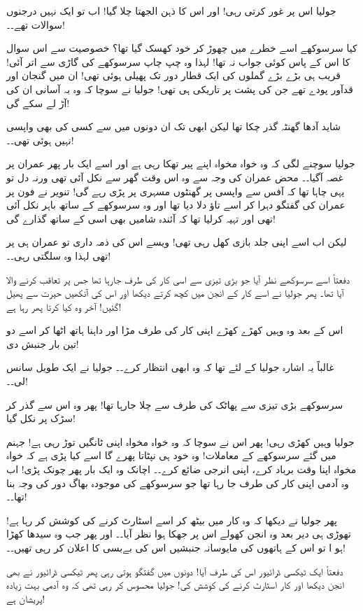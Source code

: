 جولیا اس پر غور کرتی رہی! اور اس کا ذہن الجھتا چلا گیا! اب تو ایک نہیں درجنوں سوالات تھے۔۔!

کیا سرسوکھے اسے خطرے میں چھوڑ کر خود کھسک گیا تھا؟ خصوصیت سے اس سوال کا اس کے پاس کوئی جواب نہ تھا! لہذا وہ چپ چاپ سرسوکھے کی گاڑی سے اتر آئی! قریب ہی بڑے بڑے گملوں کی ایک قطار دور تک پھیلی ہوئی تھی! ان میں گنجان اور قدآور پودے تھے جن کی پشت پر تاریکی ہی تھی! جولیا نے سوچا کہ وہ بہ آسانی ان کی آڑ لے سکے گی!

شاید آدھا گھنٹہ گذر چکا تھا لیکن ابھی تک ان دونوں میں سے کسی کی بھی واپسی نہیں ہوئی تھی۔۔!

جولیا سوچنے لگی کہ وہ خواہ مخواہ اپنے پیر تھکا رہی ہے اور اسے ایک بار پھر عمران پر غصہ آگیا۔۔ محض عمران کی وجہ سے وہ اس وقت گھر سے نکل آئی تھی ورنہ دل تو یہی چاہا تھا کہ آفس سے واپسی پر گھنٹوں مسہری پر پڑی رہے گی! تنویر نے فون پر عمران کی گفتگو دہرا کر اسے تاؤ دلا دیا تھا اور وہ سرسوکھے کے ساتھ باہر نکل آئی تھی اور تہیہ کرلیا تھا کہ آئندہ شامیں بھی اسی کے ساتھ گذارے گی!

لیکن اب اسے اپنی جلد بازی کھل رہی تھی! ویسے اس کی ذمہ داری تو عمران ہی پر تھی لہذا وہ سلگتی رہی۔۔!

دفعتاً اسے سرسوکھے نظر آیا جو بڑی تیزی سے اسی کار کی طرف جارہا تھا جس پر تعاقب کرنے والا آیا تھا۔ پھر جولیا نے اسے کار کے انجن میں کچھ کرتے دیکھا اور اس کی آنکھیں حیرت سے پھیل گئیں! آخر وہ کیا کرتا پھر رہا ہے!

اس کے بعد وہ وہیں کھڑے کھڑے اپنی کار کی طرف مڑا اور داہنا ہاتھ اٹھا کر اسے دو تین بار جنبش دی!

غالباً یہ اشارہ جولیا کے لئے تھا کہ وہ ابھی انتظار کرے۔۔ جولیا نے ایک طویل سانس لی۔۔!

سرسوکھے بڑی تیزی سے پھاٹک کی طرف سے چلا جارہا تھا! پھر وہ اس سے گذر کر سڑک پر نکل گیا!

جولیا وہیں کھڑی رہی! پھر اس نے سوچا کہ وہ خواہ مخواہ اپنی ٹانگیں توڑ رہی ہے! جہنم میں گئے سرسوکھے کے معاملات! وہ خود ہی نپٹاتا پھرے گا اسے کیا پڑی ہے کہ خواہ مخواہ اپنا وقت برباد کرے، اپنی انرجی ضائع کرے۔۔ اچانک وہ ایک بار پھر چونک پڑی!
اب وہ آدمی اپنی کار کی طرف جا رہا تھا جو سرسوکھے کی موجودہ بھاگ دور کی وجہ بنا تھا۔۔!

پھر جولیا نے دیکھا کہ وہ کار میں بیٹھ کر اسے اسٹارٹ کرنے کی کوشش کر رہا ہے! تھوڑی ہی دیر بعد وہ انجن کھولے اس پر جھکا ہوا نظر آیا۔۔ اور پھر جب وہ سیدھا کھڑا ہو ا تو اس کے ہاتھوں کی مایوسانہ جنبشیں اس کی بےبسی کا اعلان کر رہی تھیں۔۔!

دفعتاً ایک ٹیکسی ڈرائیور اس کی طرف آیا! دونوں میں گفتگو ہوتی رہی پھر ٹیکسی ڈرائیور نے بھی انجن دیکھا اور کار اسٹارٹ کرنے کی کوشش کی! جولیا محسوس کر رہی تھی کہ وہ آدمی بہت زیادہ پریشان ہے!

